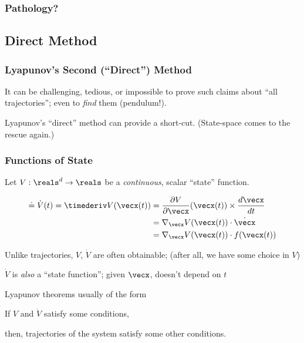 \documentclass[12pt]{beamer}
\begin{document}
\begin{frame}
\frametitle{Pathology?}
\end{frame}



\subsection{Direct Method}

\begin{frame}
\frametitle{Lyapunov's Second (``Direct'') Method}

\begin{itemize}
\vitem
It can be challenging, tedious, or impossible
to prove such claims about ``all trajectories'';
even to \emph{find} them (pendulum!).

\vitem
Lyapunov's ``direct'' method can provide a short-cut.
(State-space comes to the rescue again.)

\end{itemize}

\vfill\null
\end{frame}


\begin{frame}
\frametitle{Functions of State}

\begin{itemize}
\vitem
Let $V : \reals^d \to \reals$ be a \emph{continuous}, scalar ``state'' function.

\[
\begin{aligned}
\doteq \dot V(t) = 
\timederiv V(\vecx(t))
	&= \frac{\partial V}{\partial \vecx} (\vecx(t)) \times \frac{d\vecx}{dt}	\\
	&= \nabla_\vecx V(\vecx(t)) \cdot \dot\vecx	\\
	&= \nabla_\vecx V(\vecx(t)) \cdot f(\vecx(t))	\\
\end{aligned}
\]

\vitem
Unlike trajectories, $V$, $\dot V$ are often obtainable;
(after all, we have some choice in $V$)

\vitem
$\dot V$ is \emph{also} a ``state function''; given $\vecx$, doesn't depend on $t$

\vitem
Lyapunov theorems usually of the form

If $V$ and $\dot V$ satisfy some conditions,

then, trajectories of the system satisfy some other conditions.

\end{itemize}

\end{frame}
\end{document}
